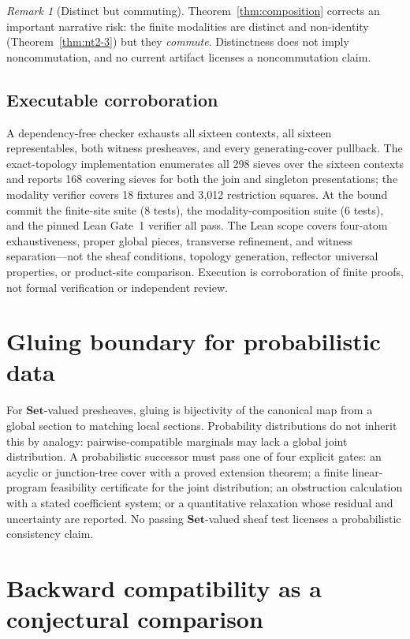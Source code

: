 \documentclass[11pt]{amsart}
\theoremstyle{definition}
\theoremstyle{remark}
\newtheorem{remark}[theorem]{Remark}
\newcommand{\Set}{\mathbf{Set}}
\begin{document}
\begin{remark}[Distinct but commuting]
Theorem~\ref{thm:composition} corrects an important narrative risk: the finite modalities are distinct and non-identity (Theorem~\ref{thm:nt2-3}) but they \emph{commute}. Distinctness does not imply noncommutation, and no current artifact licenses a noncommutation claim.
\end{remark}

\subsection*{Executable corroboration}
A dependency-free checker exhausts all sixteen contexts, all sixteen representables, both witness presheaves, and every generating-cover pullback. The exact-topology implementation enumerates all 298 sieves over the sixteen contexts and reports 168 covering sieves for both the join and singleton presentations; the modality verifier covers 18 fixtures and 3{,}012 restriction squares. At the bound commit the finite-site suite (8 tests), the modality-composition suite (6 tests), and the pinned Lean Gate~1 verifier all pass. The Lean scope covers four-atom exhaustiveness, proper global pieces, transverse refinement, and witness separation---not the sheaf conditions, topology generation, reflector universal properties, or product-site comparison. Execution is corroboration of finite proofs, not formal verification or independent review.

\section{Gluing boundary for probabilistic data}

For $\Set$-valued presheaves, gluing is bijectivity of the canonical map from a global section to matching local sections. Probability distributions do not inherit this by analogy: pairwise-compatible marginals may lack a global joint distribution. A probabilistic successor must pass one of four explicit gates: an acyclic or junction-tree cover with a proved extension theorem; a finite linear-program feasibility certificate for the joint distribution; an obstruction calculation with a stated coefficient system; or a quantitative relaxation whose residual and uncertainty are reported. No passing $\Set$-valued sheaf test licenses a probabilistic consistency claim.

\section{Backward compatibility as a conjectural comparison}
\end{document}
